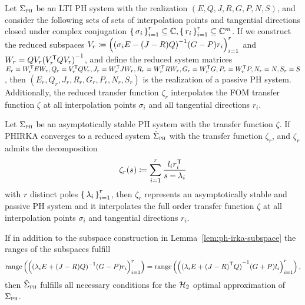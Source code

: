 \begin{lemma}\label{lem:ph-irka-subspace}
    Let $\Sigma_{\textnormal{\scshape ph}}$ be an \ac{LTI} \ac{PH} system with the realization $(E, Q, J, R, G, P, N, S)$, and consider the following sets of sets of interpolation points and tangential directions closed under complex conjugation ${\left\{\,\sigma_i\,\right\}}_{i = 1}^r \subseteq \mathbb{C}, {\left\{\,r_i\,\right\}}_{i = 1}^r \subseteq \mathbb{C}^m$.
    If we construct the reduced subspaces $V_r \coloneqq {\left( {(\sigma_i E - (J - R) Q)}^{-1} (G - P) r_i \right)}_{i = 1}^r$ and $W_r = Q V_r {(V_r^{\mkern1mu \mathsf{T}} Q V_r)}^{-1}$, and define the reduced system matrices $E_r = W_r^{\mkern1mu \mathsf{T}} E W_r, Q_r = V_r^{\mkern1mu \mathsf{T}} Q V_r, J_r = W_r^{\mkern1mu \mathsf{T}} J W_r, R_r = W_r^{\mkern1mu \mathsf{T}} R W_r, G_r = W_r^{\mkern1mu \mathsf{T}} G, P_r = W_r^{\mkern1mu \mathsf{T}} P, N_r = N, S_r = S$, then $(E_r, Q_r, J_r, R_r, G_r, P_r, N_r, S_r)$ is the realization of a passive \ac{PH} system.
    Additionally, the reduced transfer function $\zeta_r$ interpolates the \ac{FOM} transfer function $\zeta$ at all interpolation points $\sigma_i$ and all tangential directions $r_i$.
\end{lemma}

\begin{theorem}\label{thm:ph-irka-subspace}
    Let $\Sigma_{\textnormal{\scshape ph}}$ be an asymptotically stable \ac{PH} system with the transfer function $\zeta$.
    If \ac{PHIRKA} converges to a reduced system $\hat{\Sigma}_{\textnormal{\scshape ph}}$ with the transfer function $\zeta_r$, and $\zeta_r$ admits the decomposition
    \begin{equation*}
        \zeta_r(s) \coloneqq \sum\limits_{i = 1}^r \frac{l_i r_i^{\mkern1mu \mathsf{T}}}{s - \lambda_i}
    \end{equation*}
    with $r$ distinct poles ${\left\{\,\lambda_i\,\right\}}_{i = 1}^r$, then $\zeta_r$ represents an asymptotically stable and passive \ac{PH} system and it interpolates the full order transfer function $\zeta$ at all interpolation points $\sigma_i$ and tangential directions $r_i$.

    If in addition to the subspace construction in Lemma~\ref{lem:ph-irka-subspace} the ranges of the subspaces fulfill
    \begin{equation*}
        \mathop{}\!\mathrm{range}\left({\left( {(\lambda_i E + (J - R) Q)}^{-1} (G - P) r_i \right)}_{i = 1}^r\right) = \mathop{}\!\mathrm{range}\left({\left( {(\lambda_i E + {(J - R)}^{\mkern1mu \mathsf{T}} Q)}^{-1} (G + P) l_i \right)}_{i = 1}^r\right),
    \end{equation*}
    then $\hat{\Sigma}_{\textnormal{\scshape ph}}$ fulfills all necessary conditions for the $\mathcal{H}_2$ optimal approximation of $\Sigma_{\textnormal{\scshape ph}}$.
\end{theorem}

